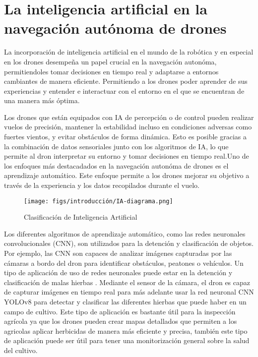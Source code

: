 \newpage
\section{La inteligencia artificial en la navegación autónoma de drones}
\label{sec:IA}

La incorporación de inteligencia artificial en el mundo de la robótica y en especial en los drones desempeña un papel crucial en la navegación autonóma, permitiendoles tomar decisiones en tiempo real y adaptarse 
a entornos cambiantes de manera eficiente. Permitiendo a los drones poder aprender de sus experiencias y entender e interactuar con el entorno en el que se encuentran de una manera más
óptima. \newline

Los drones que están equipados con IA de percepción o de control pueden realizar vuelos de precisión, mantener la estabilidad incluso en condiciones adversas como fuertes vientos, y evitar obstáculos 
de forma dinámica. Esto es posible gracias a la combinación de datos sensoriales junto con los algoritmos de IA, lo que permite 
al dron interpretar su entorno y tomar decisiones en tiempo real.Uno de los enfoques más destacadados en la navegación autonóma de drones es el aprendizaje automático. Este enfoque permite a los drones mejorar su objetivo a través de la experiencia 
y los datos recopilados durante el vuelo. 

\begin{figure} [H]
  \begin{center}
    \texttt{[image: figs/introducción/IA-diagrama.png]}
  \end{center}
  \caption{Clasificación de Inteligencia Artificial \cite{IA}}
  \label{fig:ClasificaciónIA}
\end{figure}
\newpage

Los diferentes algoritmos de aprendizaje automático, como las redes neuronales convolucionales (CNN), son utilizados para la detención y clasificación
de objetos. Por ejemplo, las CNN son capaces de analizar imágenes capturadas por las cámaras a bordo del dron para identificar obstáculos, 
peatones o vehículos. Un tipo de aplicación de uso de redes neuronales puede estar en la detención y clasificación de malas hierbas \cite{CSIC}. Mediante el sensor de la cámara, el dron es capaz de capturar imágenes en tiempo real 
para más adelante usar la red neuronal CNN YOLOv8 \cite{Ultralytics_YOLOv8} para detectar y clasificar las diferentes hierbas que puede haber en un campo de cultivo. Este tipo de aplicación es bastante útil para la inspección
agrícola ya que los drones pueden crear mapas detallados que permiten a los agricolas aplicar herbicidas de manera más eficiente y precisa, también este tipo de aplicación puede
ser útil para tener una monitorización general sobre la salud del cultivo. \newline 

